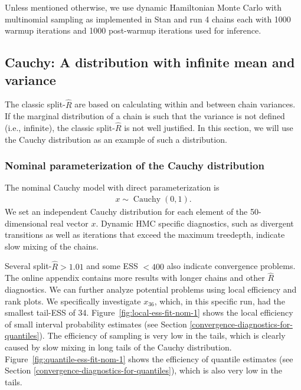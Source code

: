 \documentclass[american,]{article}
\DeclareMathOperator{\Cauchy}{Cauchy}
\theoremstyle{definition}
\begin{document}
Unless mentioned otherwise, we use dynamic Hamiltonian Monte Carlo with
multinomial sampling \citep{betancourt2017conceptual} as implemented
in Stan \citep{StanManual.2.18.0} and run 4 chains each with 1000
warmup iterations and 1000 post-warmup iterations used for inference.

\hypertarget{cauchy-a-distribution-with-infinite-mean-and-variance}{%
\subsection{Cauchy: A distribution with infinite mean and
variance}\label{cauchy-a-distribution-with-infinite-mean-and-variance}}

The classic split-\(\widehat{R}\) are based on calculating
within and between chain variances. If the marginal distribution of a
chain is such that the variance is not defined (i.e., infinite), the
classic split-\(\widehat{R}\) is not well justified. In this
section, we will use the Cauchy distribution as an example of such a
distribution. 

\hypertarget{nominal-parameterization-of-the-cauchy-distribution}{%
\subsubsection*{Nominal parameterization of the
Cauchy distribution}\label{nominal-parameterization-of-the-cauchy-distribution}}

The nominal Cauchy model with direct parameterization is
\begin{align}
  x \sim \Cauchy(0,1).
\end{align}
We set an independent Cauchy distribution for each element of the 50-dimensional 
real vector $x$. Dynamic HMC specific diagnostics, such as divergent
transitions as well as iterations that exceed the maximum treedepth,
indicate slow mixing of the chains.


Several split-\(\widehat{R}>1.01\) and some ESS \(<400\)
also indicate convergence problems. The online appendix contains more results 
with longer chains and other \(\widehat{R}\) diagnostics.
%
We can further analyze potential problems using local efficiency and
rank plots. We specifically investigate \(x_{36}\), which, in this
specific run, had the smallest tail-ESS of 34. 
Figure~\ref{fig:local-ess-fit-nom-1} shows the local efficiency of small 
interval probability estimates (see Section \ref{convergence-diagnostics-for-quantiles}).
The efficiency of sampling is very low in the tails, which is clearly
caused by slow mixing in long tails of the Cauchy distribution.  
%
Figure~\ref{fig:quantile-ess-fit-nom-1} shows the efficiency
of quantile estimates (see Section \ref{convergence-diagnostics-for-quantiles}), 
which is also very low in the tails. 
\end{document}

